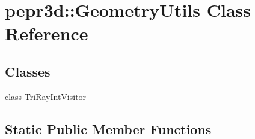 \hypertarget{classpepr3d_1_1_geometry_utils}{}\section{pepr3d\+::Geometry\+Utils Class Reference}
\label{classpepr3d_1_1_geometry_utils}
\subsection*{Classes}
\begin{DoxyCompactItemize}
\item 
class \mbox{\hyperlink{classpepr3d_1_1_geometry_utils_1_1_tri_ray_int_visitor}{Tri\+Ray\+Int\+Visitor}}
\end{DoxyCompactItemize}
\subsection*{Static Public Member Functions}
